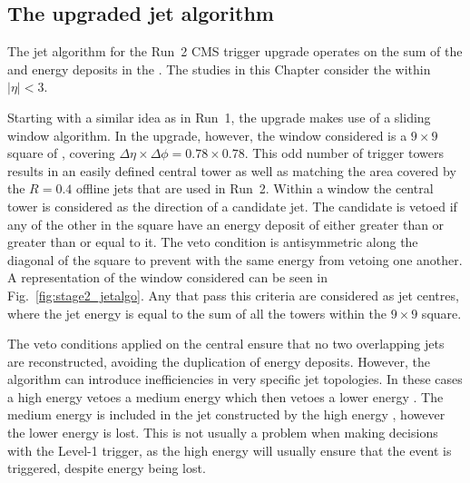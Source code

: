 \subsection{The upgraded jet algorithm}
\label{sec:stage2_jetalgo}

The jet algorithm for the Run~2 CMS trigger upgrade operates on
the sum of the \ECAL and \HCAL energy deposits in the \TTs. The studies
in this Chapter consider the \TTs within $|\eta|<3$.

Starting with a similar idea as in Run~1, the upgrade makes use of a
sliding window algorithm. In the upgrade, however, the window
considered is a $9\times9$ square of \TTs, covering
$\Delta\eta\times\Delta\phi = 0.78 \times 0.78$. This odd number of
trigger towers results in an easily defined central tower as well as
matching the area covered by the $R=0.4$ offline jets that are used in
Run~2. Within a window the central tower is considered as the
direction of a candidate jet. The candidate is vetoed if any of the
other \TTs in the square have an energy deposit of either greater than
or greater than or equal to it. The veto condition is
antisymmetric along the diagonal of the square to prevent \TTs with the
same energy from vetoing one another. A representation of the window
considered can be seen in Fig.~\ref{fig:stage2_jetalgo}.  Any \TTs that
pass this criteria are considered as jet centres, where the jet energy
is equal to the sum of all the towers within the $9\times9$ square.

The veto conditions applied on the central \TT ensure that no two
overlapping jets are reconstructed, avoiding the duplication of energy
deposits. However, the algorithm can introduce inefficiencies in very
specific jet topologies. In these cases a high energy \TT vetoes a
medium energy \TT which then vetoes a lower energy \TT. 
The medium energy \TT is included in the jet constructed by the high energy
\TT, however the lower energy \TT is lost. This is not usually a
problem when making decisions with the Level-1 trigger, as the high
energy \TT will usually ensure that the event is triggered, despite
energy being lost.

